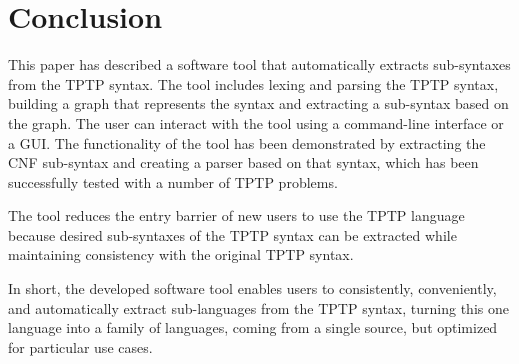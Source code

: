 
\chapter{Conclusion}\label{cha:Conclusion}

This paper has described a software tool that automatically extracts sub-syntaxes from the TPTP syntax. 
The tool includes lexing and parsing the TPTP syntax, building 
a graph that represents the syntax and extracting a sub-syntax based on the graph. The user can interact with the tool using a command-line interface or a GUI.
The functionality of the tool has been demonstrated by extracting the CNF sub-syntax and creating a parser based on that syntax, which has been successfully tested with a number of TPTP problems.

The tool reduces the entry barrier of new users to use the TPTP language because desired sub-syntaxes of the TPTP syntax can be extracted while maintaining consistency with the original TPTP syntax.

In short, the developed software tool enables users to consistently, conveniently, and automatically extract sub-languages from the TPTP syntax, turning this one language into a family of languages, coming from a single source, but optimized for particular use cases.
%
%
%
%

